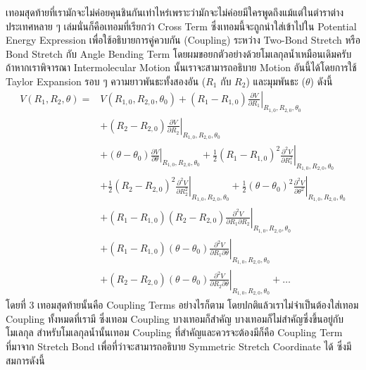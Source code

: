 เทอมสุดท้ายที่เรามักจะไม่ค่อยคุนชินกันเท่าไหร่เพราะว่ามักจะไม่ค่อยมีใครพูดถึงแม้แต่ในตำราต่างประเทศหลาย ๆ เล่มนั่นก็คือเทอมที่เรียกว่า Cross Term ซึ่งเทอมนี้จะถูกนำใส่เข้าไปใน Potential Energy Expression เพื่อใช้อธิบายการคู่ควบกัน (Coupling) ระหว่าง Two-Bond Stretch หรือ Bond Stretch กับ Angle Bending Term โดยผมขอยกตัวอย่างด้วยโมเลกุลน้ำเหมือนเดิมครับ ถ้าหากเราพิจารณา Intermolecular Motion นั้นเราจะสามารถอธิบาย Motion อันนี้ได้โดยการใช้ Taylor Expansion รอบ ๆ ความยาวพันธะทั้งสองอัน ($R_{1}$ กับ $R_{2}$) และมุมพันธะ ($\theta$) ดังนี้
%
\begin{align}
  V\left(R_1, R_2, \theta\right)
  = &
  V\left(R_{1,0}, R_{2,0}, \theta_0\right)
  + \left.\left(R_1-R_{1,0}\right) \frac{\partial V}{\partial R_1}\right|_{R_{1,0}, R_{2,0}, \theta_0} \nonumber     \\
    & + \left.\left(R_2-R_{2,0}\right) \frac{\partial V}{\partial R_2}\right|_{R_{1,0}, R_{2,0}, \theta_0} \nonumber \\
    & + \left.\left(\theta-\theta_0\right) \frac{\partial V}{\partial \theta}\right|_{R_{1,0}, R_{2,0}, \theta_0}
  + \left.\frac{1}{2}\left(R_1-R_{1,0}\right)^2
  \frac{\partial^2 V}{\partial R_1^2}\right|_{R_{1,0}, R_{2,0}, \theta_0} \nonumber                                  \\
    & + \left.\frac{1}{2}\left(R_2-R_{2,0}\right)^2
  \frac{\partial^2 V}{\partial R_2^2}\right|_{R_{1,0}, R_{2,0}, \theta_0}
  + \left.\frac{1}{2}\left(\theta-\theta_0\right)^2
  \frac{\partial^2 V}{\partial \theta^2}\right|_{R_{1,0}, R_{2,0}, \theta_0} \nonumber                               \\
    & + \left.\left(R_1-R_{1,0}\right)\left(R_2-R_{2,0}\right)
  \frac{\partial^2 V}{\partial R_1 \partial R_2}\right|_{R_{1,0}, R_{2,0}, \theta_0} \nonumber                       \\
    & + \left.\left(R_1-R_{1,0}\right)\left(\theta-\theta_0\right)
  \frac{\partial^2 V}{\partial R_1 \partial \theta}\right|_{R_{1,0}, R_{2,0}, \theta_0} \nonumber                    \\
    & + \left.\left(R_2-R_{2,0}\right)\left(\theta-\theta_0\right)
  \frac{\partial^2 V}{\partial R_2 \partial \theta}\right|_{R_{1,0}, R_{2,0}, \theta_0} + \ldots
\end{align}
%
โดยที่ 3 เทอมสุดท้ายนั้นคือ Coupling Terms อย่างไรก็ตาม โดยปกติแล้วเราไม่จำเป็นต้องใส่เทอม Coupling ทั้งหมดที่เรามี ซึ่งเทอม Coupling บางเทอมก็สำคัญ บางเทอมก็ไม่สำคัญซึ่งขึ้นอยู่กับโมเลกุล สำหรับโมเลกุลน้ำนั้นเทอม Coupling ที่สำคัญและควรจะต้องมีก็คือ Coupling Term ที่มาจาก Stretch Bond เพื่อที่ว่าจะสามารถอธิบาย Symmetric Stretch Coordinate ได้ ซึ่งมีสมการดังนี้

